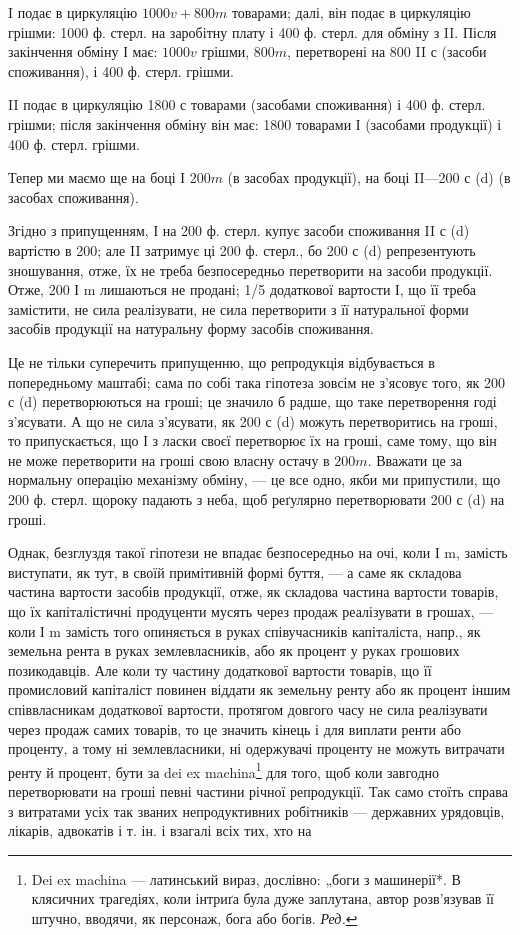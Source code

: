 \parcont{}  %
I подає в циркуляцію $1000 v + 800 m$ товарами; далі, він подає
в циркуляцію грішми: 1000 ф. стерл. на заробітну плату і 400 ф. стерл.
для обміну з II. Після закінчення обміну І має: $1000 v$ грішми, $800 m$,
перетворені на 800 II с (засоби споживання), і 400 ф. стерл. грішми.

II подає в циркуляцію 1800 с товарами (засобами споживання) і
400 ф. стерл. грішми; після закінчення обміну він має: 1800 товарами І
(засобами продукції) і 400 ф. стерл. грішми.

Тепер ми маємо ще на боці І $200 m$ (в засобах продукції), на боці
II—200 с (d) (в засобах споживання).

Згідно з припущенням, І на 200 ф. стерл. купує засоби споживання
II с (d) вартістю в 200; але II затримує ці 200 ф. стерл., бо 200 с (d)
репрезентують зношування, отже, їх не треба безпосередньо перетворити
на засоби продукції. Отже, 200 І m лишаються не продані;
1/5 додаткової вартости І, що її треба замістити, не сила реалізувати, не
сила перетворити з її натуральної форми засобів продукції на натуральну
форму засобів споживання.

Це не тільки суперечить припущенню, що репродукція відбувається
в попередньому маштабі; сама по собі така гіпотеза зовсім не з’ясовує
того, як 200 с (d) перетворюються на гроші; це значило б радше, що
таке перетворення годі з’ясувати. А що не сила з’ясувати, як 200 с (d)
можуть перетворитись на гроші, то припускається, що І з ласки своєї
перетворює їх на гроші, саме тому, що він не може перетворити на гроші
свою власну остачу в $200 m$. Вважати це за нормальну операцію механізму
обміну, — це все одно, якби ми припустили, що 200 ф. стерл.
щороку падають з неба, щоб реґулярно перетворювати 200 с (d) на гроші.

Однак, безглуздя такої гіпотези не впадає безпосередньо на очі, коли І m,
замість виступати, як тут, в своїй примітивній формі буття, — а саме як
складова частина вартости засобів продукції, отже, як складова частина
вартости товарів, що їх капіталістичні продуценти мусять через продаж
реалізувати в грошах, — коли І m замість того опиняється в руках співучасників
капіталіста, напр., як земельна рента в руках землевласників,
або як процент у руках грошових позикодавців. Але коли ту частину додаткової
вартости товарів, що її промисловий капіталіст повинен віддати
як земельну ренту або як процент іншим співвласникам додаткової вартости,
протягом довгого часу не сила реалізувати через продаж самих
товарів, то це значить кінець і для виплати ренти або проценту, а тому
ні землевласники, ні одержувачі проценту не можуть витрачати ренту й
процент, бути за dei ex machina\footnote*{
Dei ex machina — латинський вираз, дослівно: „боги з машинерії*. В клясичних
трагедіях, коли інтриґа була дуже заплутана, автор розв’язував її штучно,
вводячи, як персонаж, бога або богів. \emph{Ред.}
} для того, щоб коли завгодно перетворювати
на гроші певні частини річної репродукції. Так само стоїть
справа з витратами усіх так званих непродуктивних робітників — державних
урядовців, лікарів, адвокатів і т. ін. і взагалі всіх тих, хто на
\parbreak{}  %
